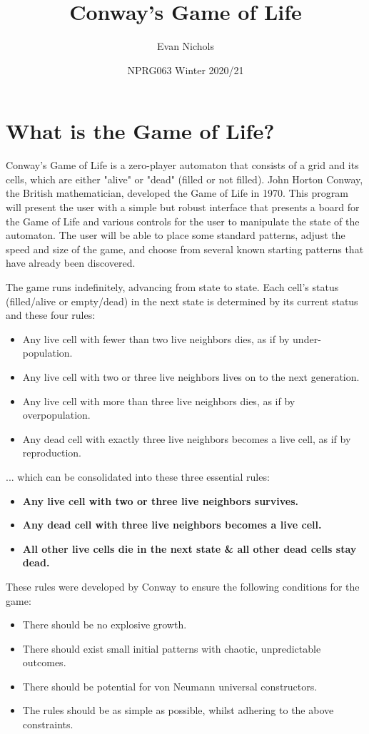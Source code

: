 \documentclass[12pt, letterpaper]{article}
\title{Conway's Game of Life}
\author{Evan Nichols}
\date{NPRG063 Winter 2020/21}
\begin{document}
\maketitle

\section*{What is the Game of Life?}
Conway's Game of Life is a zero-player automaton that consists of a grid and its cells, which are either "alive" or "dead" (filled or not filled). John Horton Conway, the British mathematician, developed the Game of Life in 1970. This program will present the user with a simple but robust interface that presents a board for the Game of Life and various controls for the user to manipulate the state of the automaton. The user will be able to place some standard patterns, adjust the speed and size of the game, and choose from several known starting patterns that have already been discovered.

The game runs indefinitely, advancing from state to state. Each cell's status (filled/alive or empty/dead) in the next state is determined by its current status and these four rules:
\begin{itemize}
\item{Any live cell with fewer than two live neighbors dies, as if by under-population.}
\item{Any live cell with two or three live neighbors lives on to the next generation.}
\item{Any live cell with more than three live neighbors dies, as if by overpopulation.}
\item{Any dead cell with exactly three live neighbors becomes a live cell, as if by reproduction.}
\end{itemize}

... which can be consolidated into these three essential rules:
\begin{itemize}
\item{\textbf{Any live cell with two or three live neighbors survives.}}
\item{\textbf{Any dead cell with three live neighbors becomes a live cell.}}
\item{\textbf{All other live cells die in the next state \& all other dead cells stay dead.}}
\end{itemize}

These rules were developed by Conway to ensure the following conditions for the game:
\begin{itemize}
\item{There should be no explosive growth.}
\item{There should exist small initial patterns with chaotic, unpredictable outcomes.}
\item{There should be potential for von Neumann universal constructors.}
\item{The rules should be as simple as possible, whilst adhering to the above constraints.}
\end{itemize}
\end{document}
